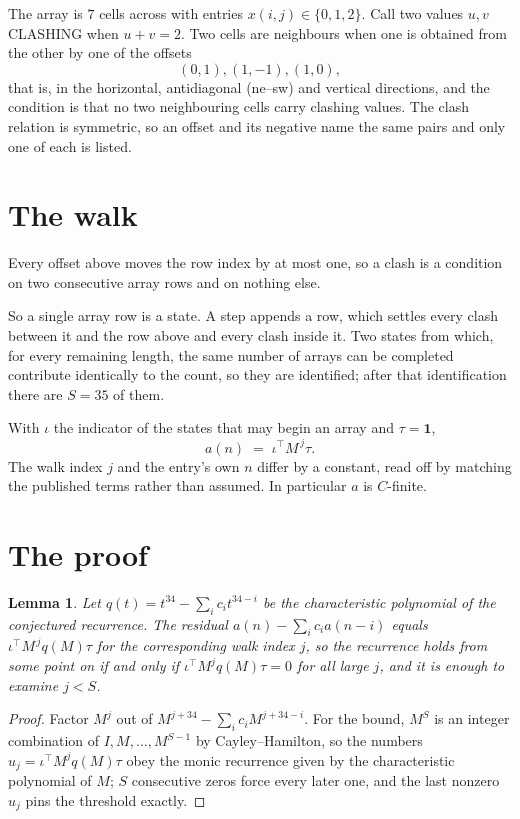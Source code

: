 \documentclass[11pt,a4paper]{article}
\theoremstyle{plain}
\newtheorem{lemma}[theorem]{Lemma}
\theoremstyle{definition}
\begin{document}
The array is $7$ cells across with entries $x(i,j)\in\{0,1,2\}$. Call two values $u,v$ CLASHING
when $u+v=2$. Two cells are neighbours when one is obtained from the other by one of
the offsets
\[
(0,1), (1,-1), (1,0),
\]
that is, in the horizontal, antidiagonal (ne--sw) and vertical directions, and the condition is that no two neighbouring cells carry
clashing values. The clash relation is symmetric, so an offset and its negative name the
same pairs and only one of each is listed.

\section{The walk}

Every offset above moves the row index by at most one, so a clash is a condition on two
consecutive array rows and on nothing else.

So a single array row is a state. A step appends a row, which settles every clash between it
and the row above and every clash inside it. Two states from which, for every remaining length,
the same number of arrays can be completed contribute identically to the count, so they are
identified; after that identification there are $S=35$ of them.

With $\iota$ the indicator of the states that may begin an array and $\tau=\mathbf{1}$,
\[
a(n)\;=\;\iota^{\!\top}M^{\,j}\tau .
\]
The walk index $j$ and the entry's own $n$ differ by a constant, read off by matching the
published terms rather than assumed. In particular $a$ is $C$-finite.

\section{The proof}

\begin{lemma}\label{lem:crit}
Let $q(t)=t^{34}-\sum_i c_it^{34-i}$ be the characteristic polynomial of the
conjectured recurrence. The residual $a(n)-\sum_ic_ia(n-i)$ equals
$\iota^{\!\top}M^{\,j}q(M)\tau$ for the corresponding walk index $j$, so the recurrence
holds from some point on if and only if $\iota^{\!\top}M^{j}q(M)\tau=0$ for all large $j$,
and it is enough to examine $j<S$.
\end{lemma}

\begin{proof}
Factor $M^{j}$ out of $M^{j+34}-\sum_ic_iM^{j+34-i}$. For the bound, $M^{S}$
is an integer combination of $I,M,\dots,M^{S-1}$ by Cayley--Hamilton, so the numbers
$u_j=\iota^{\!\top}M^{j}q(M)\tau$ obey the monic recurrence given by the characteristic
polynomial of $M$; $S$ consecutive zeros force every later one, and the last nonzero $u_j$
pins the threshold exactly.
\end{proof}
\end{document}
